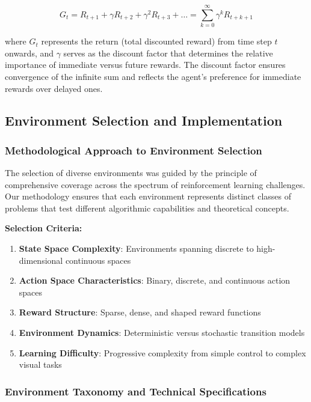 \documentclass[12pt]{article}
\begin{document}
{{{\begin{equation}
G_t = R_{t+1} + \gamma R_{t+2} + \gamma^2 R_{t+3} + \ldots = \sum_{k=0}^{\infty} \gamma^k R_{t+k+1}
\end{equation}

where $G_t$ represents the return (total discounted reward) from time step $t$ onwards, and $\gamma$ serves as the discount factor that determines the relative importance of immediate versus future rewards. The discount factor ensures convergence of the infinite sum and reflects the agent's preference for immediate rewards over delayed ones.

\subsection{Environment Selection and Implementation}

\subsubsection{Methodological Approach to Environment Selection}

The selection of diverse environments was guided by the principle of comprehensive coverage across the spectrum of reinforcement learning challenges. Our methodology ensures that each environment represents distinct classes of problems that test different algorithmic capabilities and theoretical concepts.

\textbf{Selection Criteria:}
\begin{enumerate}
    \item \textbf{State Space Complexity}: Environments spanning discrete to high-dimensional continuous spaces
    \item \textbf{Action Space Characteristics}: Binary, discrete, and continuous action spaces
    \item \textbf{Reward Structure}: Sparse, dense, and shaped reward functions
    \item \textbf{Environment Dynamics}: Deterministic versus stochastic transition models
    \item \textbf{Learning Difficulty}: Progressive complexity from simple control to complex visual tasks
\end{enumerate}

\subsubsection{Environment Taxonomy and Technical Specifications}

}}}
\end{document}

